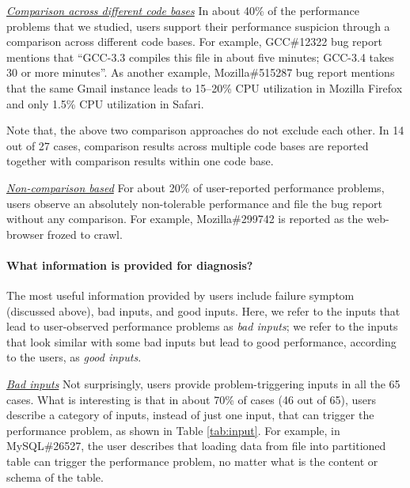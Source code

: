 \underline{\it Comparison across different code bases} 
In about 40\% of the performance problems that we studied, users support
their performance suspicion through a comparison 
across different code bases. For example, GCC\#12322 bug report mentions
that ``GCC-3.3 compiles this file in about five minutes; GCC-3.4 takes
30 or more minutes''. As another example, Mozilla\#515287 bug report
mentions that the same Gmail instance leads to 15--20\% CPU utilization
in Mozilla Firefox and only 1.5\% CPU utilization in Safari.

Note that, the above two comparison approaches do not exclude each other.
In 14 out of 27 cases, comparison results across multiple code bases are reported
together with comparison results within one code base.

\underline{\it Non-comparison based}
For about 20\% of user-reported performance problems, users observe an
absolutely non-tolerable performance and file the bug report without any comparison.
For example, Mozilla\#299742 is reported as the web-browser frozed to crawl.

\paragraph{What information is provided for diagnosis?}

The most useful information provided by users include failure
symptom (discussed above), bad inputs, and good inputs. Here, we refer to the 
inputs that lead to user-observed performance problems
as \textit{bad inputs}; we refer to the
inputs that look similar with some bad inputs but lead to good performance,
according to the users,
as \textit{good inputs}.

\underline{\it Bad inputs} Not surprisingly, users provide problem-triggering
inputs in all the 65 cases. What is interesting is that in about 70\% of
cases (46 out of 65), users describe a category of inputs, instead of just
one input, that can trigger
the performance problem, as shown in Table \ref{tab:input}. For example,
in MySQL\#26527, the user describes that loading data from file into partitioned
table can trigger the performance problem, no matter what is the content or 
schema of the table. 

